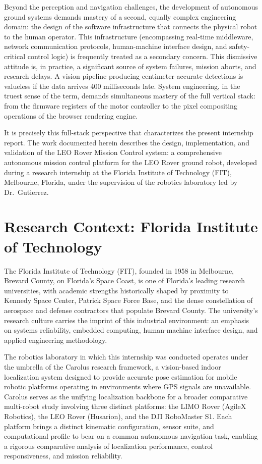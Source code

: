 Beyond the perception and navigation challenges, the development of autonomous ground systems demands mastery of a second, equally complex engineering domain: the design of the software infrastructure that connects the physical robot to the human operator. This infrastructure (encompassing real-time middleware, network communication protocols, human-machine interface design, and safety-critical control logic) is frequently treated as a secondary concern. This dismissive attitude is, in practice, a significant source of system failures, mission aborts, and research delays. A vision pipeline producing centimeter-accurate detections is valueless if the data arrives 400 milliseconds late. System engineering, in the truest sense of the term, demands simultaneous mastery of the full vertical stack: from the firmware registers of the motor controller to the pixel compositing operations of the browser rendering engine.

It is precisely this full-stack perspective that characterizes the present internship report. The work documented herein describes the design, implementation, and validation of the LEO Rover Mission Control system: a comprehensive autonomous mission control platform for the LEO Rover ground robot, developed during a research internship at the Florida Institute of Technology (FIT), Melbourne, Florida, under the supervision of the robotics laboratory led by Dr.\ Gutierrez.

\section{Research Context: Florida Institute of Technology}

The Florida Institute of Technology (FIT), founded in 1958 in Melbourne, Brevard County, on Florida's Space Coast, is one of Florida's leading research universities, with academic strengths historically shaped by proximity to Kennedy Space Center, Patrick Space Force Base, and the dense constellation of aerospace and defense contractors that populate Brevard County. The university's research culture carries the imprint of this industrial environment: an emphasis on systems reliability, embedded computing, human-machine interface design, and applied engineering methodology.

The robotics laboratory in which this internship was conducted operates under the umbrella of the Carolus research framework, a vision-based indoor localization system designed to provide accurate pose estimation for mobile robotic platforms operating in environments where GPS signals are unavailable. Carolus serves as the unifying localization backbone for a broader comparative multi-robot study involving three distinct platforms: the LIMO Rover (AgileX Robotics), the LEO Rover (Husarion), and the DJI RoboMaster S1. Each platform brings a distinct kinematic configuration, sensor suite, and computational profile to bear on a common autonomous navigation task, enabling a rigorous comparative analysis of localization performance, control responsiveness, and mission reliability.

